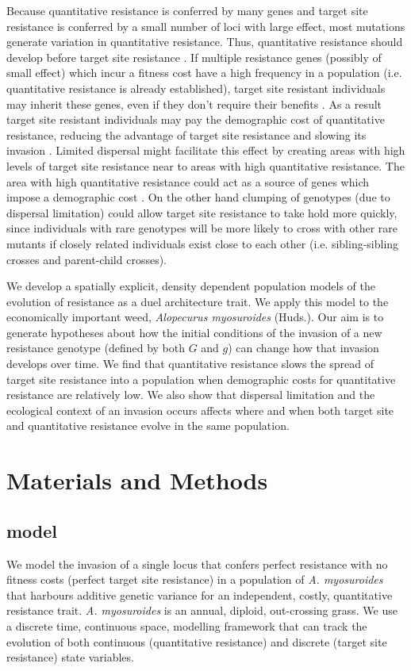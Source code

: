 \documentclass[10pt,letterpaper]{article}
\begin{document}
Because quantitative resistance is conferred by many genes \cite{petit2010, Busi2013} and target site resistance is conferred by a small number of loci with large effect, most mutations generate variation in quantitative resistance. Thus, quantitative resistance should develop before target site resistance \cite{Dely2010newPhy}. If multiple resistance genes (possibly of small effect) which incur a fitness cost have a high frequency in a population (i.e. quantitative resistance is already established), target site resistant individuals may inherit these genes, even if they don't require their benefits \cite{Yeam2015}. As a result target site resistant individuals may pay the demographic cost of quantitative resistance, reducing the advantage of target site resistance and slowing its invasion \cite{Chev2008}. Limited dispersal might facilitate this effect by creating areas with high levels of target site resistance near to areas with high quantitative resistance. The area with high quantitative resistance could act as a source of genes which impose a demographic cost \cite{Dely2010, Yeam2015}. On the other hand clumping of genotypes (due to dispersal limitation) could allow target site resistance to take hold more quickly, since individuals with rare genotypes will be more likely to cross with other rare mutants if closely related individuals exist close to each other (i.e. sibling-sibling crosses and parent-child crosses).

We develop a spatially explicit, density dependent population models of the evolution of resistance as a duel architecture trait. We apply this model to the economically important weed, \textit{Alopecurus myosuroides} (Huds.). Our aim is to generate hypotheses about how the initial conditions of the invasion of a new resistance genotype (defined by both $G$ and $g$) can change how that invasion develops over time. We find that quantitative resistance slows the spread of target site resistance into a population when demographic costs for quantitative resistance are relatively low. We also show that dispersal limitation and the ecological context of an invasion occurs affects where and when both target site and quantitative resistance evolve in the same population. 

\section*{Materials and Methods}
\subsection*{model}
We model the invasion of a single locus that confers perfect resistance with no fitness costs (perfect target site resistance) in a population of \textit{A. myosuroides} that harbours additive genetic variance for an independent, costly, quantitative resistance trait. \textit{A. myosuroides} is an annual, diploid, out-crossing grass. We use a discrete time, continuous space, modelling framework that can track the evolution of both continuous (quantitative resistance) and discrete (target site resistance) state variables.     
\end{document}
